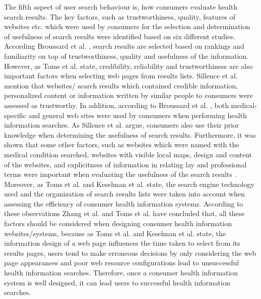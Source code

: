 \documentclass[]{article}
\begin{document}
The fifth aspect of user search behaviour is, how consumers evaluate health search results. The key factors, such as trustworthiness, quality, features of websites etc. which were used by consumers for the selection and determination of usefulness of search results were identified based on six different studies. According Broussard et al. \cite{broussard2013seeking}, search results are selected based on rankings and familiarity on top of trustworthiness, quality and usefulness of the information. However, as Toms et al. \cite{toms2007consumers} state, credibility, reliability and trustworthiness are also important factors when selecting web pages from results lists. Sillence et al. \cite{sillence2007patients} mention that websites/ search results which contained credible information, personalized content or information written by similar people to consumers were assessed as trustworthy. In addition, according to Broussard et al. \cite{broussard2013seeking}, both medical-specific and general web sites were used by consumers when performing health information searches. As Sillence et al. \cite{sillence2007patients} argue, consumers also use their prior knowledge when determining the usefulness of search results. Furthermore, it was shown that some other factors, such as websites which were named with the medical condition searched, websites with visible local maps, design and content of the websites, and explicitness of information in relating lay and professional terms were important when evaluating the usefulness of the search results \cite{broussard2013seeking,graham2006exploring,sillence2007patients,keselman2008consumer}. Moreover, as Toms et al. and Keselman et al. \cite{toms2007consumers,keselman2008consumer} state, the search engine technology used and the organization of search results lists were taken into account when assessing the efficiency of consumer health information systems. According to these observations Zhang et al. and Toms et al. \cite{zhang2012health,toms2007consumers} have concluded that, all these factors should be considered when designing consumer health information websites/systems, because as Toms et al. and Keselman et al. \cite{toms2007consumers,keselman2008consumer} state, the information design of a web page influences the time taken to select from its results pages, users tend to make erroneous decisions by only considering the web page appearances and poor web resource configurations lead to unsuccessful health information searches. Therefore, once a consumer health information system is well designed, it can lead users to successful health information searches. 
\end{document}
